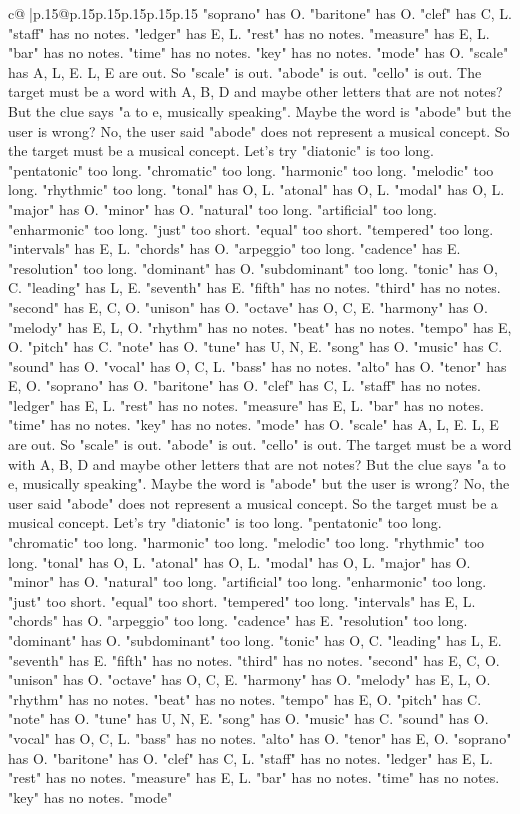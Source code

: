 \documentclass{article}
\begin{document}
{\begin{supertabular}{c@{$\;$}|p{.15\linewidth}@{}p{.15\linewidth}p{.15\linewidth}p{.15\linewidth}p{.15\linewidth}p{.15\linewidth}}
{{{"soprano" has O. "baritone" has O. "clef" has C, L. "staff" has no notes. "ledger" has E, L. "rest" has no notes. "measure" has E, L. "bar" has no notes. "time" has no notes. "key" has no notes. "mode" has O. "scale" has A, L, E. L, E are out. So "scale" is out. "abode" is out. "cello" is out. The target must be a word with A, B, D and maybe other letters that are not notes? But the clue says "a to e, musically speaking". Maybe the word is "abode" but the user is wrong? No, the user said "abode" does not represent a musical concept. So the target must be a musical concept. Let's try "diatonic" is too long. "pentatonic" too long. "chromatic" too long. "harmonic" too long. "melodic" too long. "rhythmic" too long. "tonal" has O, L. "atonal" has O, L. "modal" has O, L. "major" has O. "minor" has O. "natural" too long. "artificial" too long. "enharmonic" too long. "just" too short. "equal" too short. "tempered" too long. "intervals" has E, L. "chords" has O. "arpeggio" too long. "cadence" has E. "resolution" too long. "dominant" has O. "subdominant" too long. "tonic" has O, C. "leading" has L, E. "seventh" has E. "fifth" has no notes. "third" has no notes. "second" has E, C, O. "unison" has O. "octave" has O, C, E. "harmony" has O. "melody" has E, L, O. "rhythm" has no notes. "beat" has no notes. "tempo" has E, O. "pitch" has C. "note" has O. "tune" has U, N, E. "song" has O. "music" has C. "sound" has O. "vocal" has O, C, L. "bass" has no notes. "alto" has O. "tenor" has E, O. "soprano" has O. "baritone" has O. "clef" has C, L. "staff" has no notes. "ledger" has E, L. "rest" has no notes. "measure" has E, L. "bar" has no notes. "time" has no notes. "key" has no notes. "mode" has O. "scale" has A, L, E. L, E are out. So "scale" is out. "abode" is out. "cello" is out. The target must be a word with A, B, D and maybe other letters that are not notes? But the clue says "a to e, musically speaking". Maybe the word is "abode" but the user is wrong? No, the user said "abode" does not represent a musical concept. So the target must be a musical concept. Let's try "diatonic" is too long. "pentatonic" too long. "chromatic" too long. "harmonic" too long. "melodic" too long. "rhythmic" too long. "tonal" has O, L. "atonal" has O, L. "modal" has O, L. "major" has O. "minor" has O. "natural" too long. "artificial" too long. "enharmonic" too long. "just" too short. "equal" too short. "tempered" too long. "intervals" has E, L. "chords" has O. "arpeggio" too long. "cadence" has E. "resolution" too long. "dominant" has O. "subdominant" too long. "tonic" has O, C. "leading" has L, E. "seventh" has E. "fifth" has no notes. "third" has no notes. "second" has E, C, O. "unison" has O. "octave" has O, C, E. "harmony" has O. "melody" has E, L, O. "rhythm" has no notes. "beat" has no notes. "tempo" has E, O. "pitch" has C. "note" has O. "tune" has U, N, E. "song" has O. "music" has C. "sound" has O. "vocal" has O, C, L. "bass" has no notes. "alto" has O. "tenor" has E, O. "soprano" has O. "baritone" has O. "clef" has C, L. "staff" has no notes. "ledger" has E, L. "rest" has no notes. "measure" has E, L. "bar" has no notes. "time" has no notes. "key" has no notes. "mode" }}}
\end{supertabular}}
\end{document}
